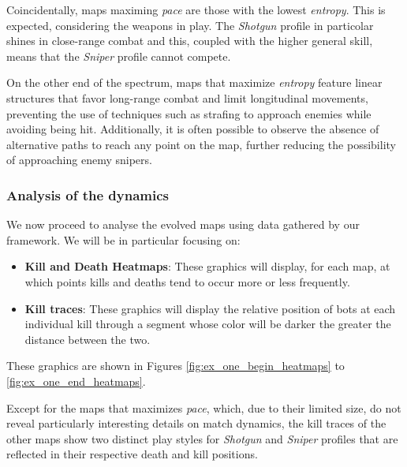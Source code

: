Coincidentally, maps maximing \textit{pace} are those with the lowest \textit{entropy}. This is expected, considering the weapons in play. The \textit{Shotgun} profile in particolar shines in close-range combat and this, coupled with the higher general skill, means that the \textit{Sniper} profile cannot compete.

On the other end of the spectrum, maps that maximize \textit{entropy} feature linear structures that favor long-range combat and limit longitudinal movements, preventing the use of techniques such as strafing to approach enemies while avoiding being hit. Additionally, it is often possible to observe the absence of alternative paths to reach any point on the map, further reducing the possibility of approaching enemy snipers. 


\subsubsection{Analysis of the dynamics}
We now proceed to analyse the evolved maps using data gathered by our framework. We will be in particular focusing on:
\begin{itemize}
\item \textbf{Kill and Death Heatmaps}: These graphics will display, for each map, at which points kills and deaths tend to occur more or less frequently.
\item \textbf{Kill traces}: These graphics will display the relative position of bots at each individual kill through a segment whose color will be darker the greater the distance between the two.
\end{itemize} 

These graphics are shown in Figures
\ref{fig:ex_one_begin_heatmaps} to \ref{fig:ex_one_end_heatmaps}.

Except for the maps that maximizes \textit{pace}, which, due to their limited size, do not reveal particularly interesting details on match dynamics, the kill traces of the other maps show two distinct play styles for \textit{Shotgun} and \textit{Sniper} profiles that are reflected in their respective death and kill positions.

